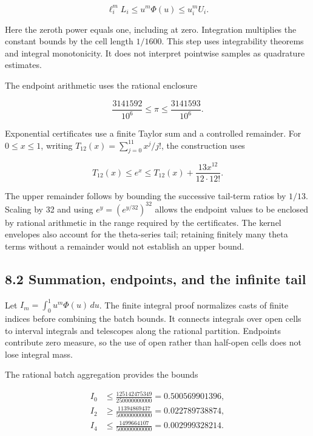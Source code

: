 \documentclass[
  11pt,
]{article}
\begin{document}
\[\ell_{i}^{m}L_{i} \leq u^{m}\Phi(u) \leq u_{i}^{m}U_{i}.\]

Here the zeroth power equals one, including at zero. Integration multiplies the constant bounds by the cell length \(1/1600\). This step uses integrability theorems and integral monotonicity. It does not interpret pointwise samples as quadrature estimates.

The endpoint arithmetic uses the rational enclosure

\[\frac{3141592}{10^{6}} \leq \pi \leq \frac{3141593}{10^{6}}.\]

Exponential certificates use a finite Taylor sum and a controlled remainder. For \(0 \leq x \leq 1\), writing \(T_{12}(x) = \sum_{j = 0}^{11}x^{j}/j!\), the construction uses

\[T_{12}(x) \leq e^{x} \leq T_{12}(x) + \frac{13x^{12}}{12 \cdot 12!}.\]

The upper remainder follows by bounding the successive tail-term ratios by \(1/13\). Scaling by 32 and using \(e^{y} = \left( e^{y/32} \right)^{32}\) allows the endpoint values to be enclosed by rational arithmetic in the range required by the certificates. The kernel envelopes also account for the theta-series tail; retaining finitely many theta terms without a remainder would not establish an upper bound.

\hypertarget{summation-endpoints-and-the-infinite-tail}{%
\subsection{8.2 Summation, endpoints, and the infinite tail}\label{summation-endpoints-and-the-infinite-tail}}

Let \(I_{m} = \int_{0}^{1}u^{m}\Phi(u)\, du\). The finite integral proof normalizes casts of finite indices before combining the batch bounds. It connects integrals over open cells to interval integrals and telescopes along the rational partition. Endpoints contribute zero measure, so the use of open rather than half-open cells does not lose integral mass.

The rational batch aggregation provides the bounds

\[\begin{matrix}
I_{0} & \leq \frac{125142475349}{250000000000} = 0.500569901396, \\
I_{2} & \geq \frac{11394869437}{500000000000} = 0.022789738874, \\
I_{4} & \leq \frac{1499664107}{500000000000} = 0.002999328214.
\end{matrix}\]
\end{document}
